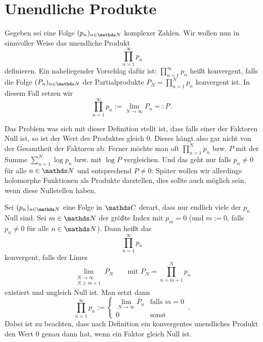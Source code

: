 \section{Unendliche Produkte}

Gegeben sei eine Folge $(p_n)_{n\in\NN}$ komplexer Zahlen.
Wir wollen nun in sinnvoller Weise das unendliche Produkt
\[
	\prod _ {n=1} ^\infty p_n
\]
definieren.
Ein naheliegender Vorschlag dafür ist:
$\prod _ {n=1} ^\infty p_n$ heißt konvergent, falls die Folge $(P_n)_{n\in\NN}$ der Partialprodukte $P_N = \prod _{n=1}^N p_n$ konvergent ist.
In diesem Fall setzen wir
\[
	\prod_{n=1} ^\infty p_n := \lim_{N\to\infty} P_n =: P\,.
\]

Das Problem was sich mit dieser Definition stellt ist, dass falls einer der Faktoren Null ist, so ist der Wert des Produktes gleich $0$.
Dieses hängt also gar nicht von der Gesamtheit der Faktoren ab.
Ferner möchte man oft $\prod _{n=1}^N p_n$ bzw. $P$ mit der Summe $\sum _{n=1}^N \log p_n$ bzw. mit $\log P$ vergleichen.
Und das geht nur falls $p_n\not=0$ für alle $n\in\NN$ und entsprechend $P\not=0$.
Später wollen wir allerdings holomorphe Funktionen als Produkte darstellen, dies sollte auch möglich sein, wenn diese Nullstellen haben.

\begin{defi}
Sei $(p_n)_{n\in\NN}$ eine Folge in $\CC$ derart, dass nur endlich viele der $p_n$ Null sind.
Sei $m\in \NN$ der größte Index mit $p_m = 0$ (und $m:=0$, falls $p_n \not= 0$ für alle $n\in\NN$).
Dann heißt das 
\[
	\prod_{n=1}^\infty p_n
\]
konvergent, falls der Limes
\[
	\lim_{\substack{N\to\infty\\ \scriptscriptstyle N \geq m+1}} P_N
	\qquad \text{mit } P_N = \prod_{n=m+1}^N p_n
\]
existiert und ungleich Null ist.
Man setzt dann
\[
	\prod _ {n=1} ^\infty p_n :=
	\begin{cases}
		\lim\limits_{N\to\infty} P_n &\text{falls } m=0 \\
		0 &\text{sonst}
	\end{cases}
	\,.
\]
Dabei ist zu beachten, dass nach Definition ein konvergentes unendliches Produkt den Wert 0 genau dann hat, wenn ein Faktor gleich Null ist.
\end{defi}

